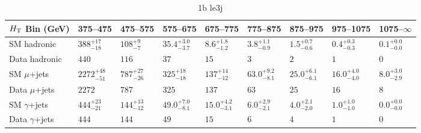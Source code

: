 \documentclass[8pt]{article}
\def\scalht{\mbox{$H_{\rm{T}}$}\xspace}
\newcommand\T{\rule{0pt}{2.6ex}}
\newcommand\B{\rule[-1.2ex]{0pt}{0pt}}
\begin{document}
\begin{table}[ht!]
\caption{1b le3j}
\label{tab:ensemble-1b le3j}
\centering
\begin{tabular}{ lllllllll }

\hline
\scalht Bin (GeV)       & 375--475                       & 475--575                       & 575--675                       & 675--775                       & 775--875                       & 875--975                       & 975--1075                      & 1075--$\infty$                 \\ [1.000000ex]
\hline
SM hadronic\T           & $388^{+17}_{-18}$              & $108^{+9}_{-7}$                & $35.4^{+3.0}_{-3.7}$           & $8.6^{+1.8}_{-1.2}$            & $3.8^{+1.1}_{-0.9}$            & $1.5^{+0.7}_{-0.6}$            & $0.4^{+0.3}_{-0.3}$            & $0.1^{+0.0}_{-0.0}$            \\ 
Data hadronic\B         & $440$                          & $116$                          & $37$                           & $15$                           & $3$                            & $2$                            & $1$                            & $0$                            \\ 
\hline
SM $\mu$+jets\T         & $2272^{+48}_{-51}$             & $787^{+27}_{-26}$              & $325^{+18}_{-18}$              & $137^{+14}_{-12}$              & $63.0^{+9.2}_{-8.1}$           & $25.0^{+6.1}_{-6.1}$           & $16.0^{+4.0}_{-4.0}$           & $8.0^{+3.0}_{-2.9}$            \\ 
Data $\mu$+jets\B       & $2272$                         & $787$                          & $325$                          & $137$                          & $63$                           & $25$                           & $16$                           & $8$                            \\ 
\hline
SM $\gamma$+jets\T      & $444^{+23}_{-21}$              & $144^{+13}_{-12}$              & $49.0^{+7.0}_{-8.1}$           & $15.0^{+4.2}_{-3.1}$           & $6.0^{+2.9}_{-2.1}$            & $4.0^{+2.1}_{-2.0}$            & $1.0^{+1.0}_{-1.0}$            & $0.0^{+0.0}_{-0.0}$            \\ 
Data $\gamma$+jets\B    & $444$                          & $144$                          & $49$                           & $15$                           & $6$                            & $4$                            & $1$                            & $0$                            \\ 
\hline

\end{tabular}
\end{table}
\end{document}
